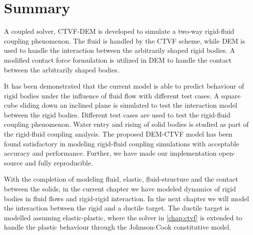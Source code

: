 

\FloatBarrier%
\section{Summary}
\label{sec:Summary}
A coupled solver, CTVF-DEM is developed to simulate a two-way rigid-fluid
coupling phenomenon. The fluid is handled by the CTVF scheme, while DEM is
used to handle the interaction between the arbitrarily shaped rigid bodies. A
modified contact force formulation is utilized in DEM to handle the contact
between the arbitrarily shaped bodies.

It has been demonstrated that the current model is able to predict behaviour of
rigid bodies under the influence of fluid flow with different test cases. A
square cube sliding down an inclined plane is simulated to test the interaction
model between the rigid bodies. Different test cases are used to test the
rigid-fluid coupling phenomenon. Water entry and rising of solid bodies is
studied as part of the rigid-fluid coupling analysis.
The proposed DEM-CTVF model has been found satisfactory in modeling rigid-fluid
coupling simulations with acceptable accuracy and performance. Further, we have
made our implementation open-source and fully reproducible.

With the completion of modeling fluid, elastic, fluid-structure and the contact
between the solids, in the current chapter we have modeled dynamics of rigid
bodies in fluid flows and rigid-rigid interaction. In the next chapter we will
model the interaction between the rigid and a ductile target. The ductile target
is modelled assuming elastic-plastic, where the solver in \cref{chap:ctvf} is
extended to handle the plastic behaviour through the Johnson-Cook constitutive
model.
